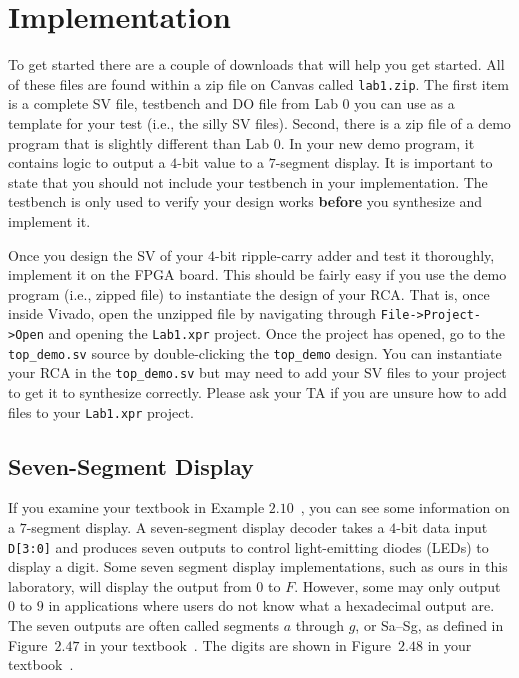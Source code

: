 \documentclass{article}
\begin{document}
\section{Implementation}

To get started there are a couple of downloads that will help you
get started.  All of these files are found within a zip file on Canvas
called \verb!lab1.zip!.
The first item is a complete SV file, testbench and DO
file from Lab 0 you can use as a template for your test (i.e., the
silly SV files).   
Second, there is a zip
file of a demo program that is slightly different than Lab 0.  In your
new demo program, it contains logic to output a $4$-bit value to a
$7$-segment display.  
It is important to state that you should not include your testbench in
your implementation. The testbench is only used to verify your design
works \textbf{before} you synthesize and implement it.

Once you design the SV of your $4$-bit ripple-carry adder
and test it thoroughly, implement it on the
FPGA board.  This should be fairly easy if you use the demo program
(i.e., zipped file) to instantiate the design of your RCA.
That is, once inside Vivado, open the unzipped file by navigating
through \verb!File->Project->Open! and opening the \verb!Lab1.xpr!
project.  Once the project has opened, go to the \verb!top_demo.sv!
source by double-clicking the \verb!top_demo!
design.  You can instantiate your RCA in the \verb!top_demo.sv! but
may need to add your SV files to your project to get it to synthesize
correctly.
Please ask your TA if you are unsure
how to add files to your \verb!Lab1.xpr! project.

\subsection{Seven-Segment Display}

If you examine your textbook in Example $2.10$~\cite{ddca-riscv},
you can see some
information on a $7$-segment display.
A seven-segment display decoder takes a $4$-bit data input
\verb!D[3:0]! and produces seven outputs to control light-emitting
diodes (LEDs) to display a digit.
Some seven segment display implementations, such as ours in this
laboratory, will display the output from $0$ to $F$.  However, some
may only output $0$ to $9$ in applications where users do not know
what a hexadecimal output are.
The seven outputs are often
called segments $a$ through $g$, or Sa–Sg, as defined in Figure~$2.47$ in
your textbook~\cite{ddca-riscv}. The
digits are shown in Figure~$2.48$ in your textbook~\cite{ddca-riscv}.
\end{document}
